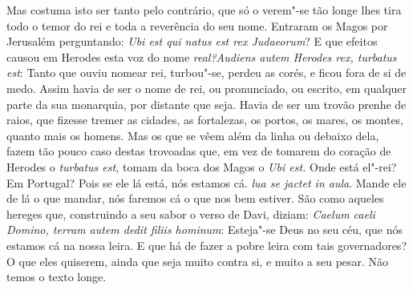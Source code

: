 Mas costuma isto ser tanto pelo contrário, que só o verem"-se tão longe
lhes tira todo o temor do rei e toda a reverência do seu nome. Entraram
os Magos por Jerusalém perguntando: \emph{Ubi est qui natus est rex
Judaeorum}? E que efeitos causou em Herodes esta voz do nome
\emph{real?Audiens autem Herodes rex, turbatus est}: Tanto que
ouviu nomear rei, turbou"-se, perdeu as corés, e ficou fora de si de
medo. Assim havia de ser o nome de rei, ou pronunciado, ou escrito,
em qualquer parte da sua monarquia, por distante que seja. Havia de ser
um trovão prenhe de raios, que fizesse tremer as cidades, as fortalezas,
os portos, os mares, os montes, quanto mais os homens. Mas os que se
vêem além da linha ou debaixo dela, fazem tão pouco caso destas
trovoadas que, em vez de tomarem do coração de Herodes o \emph{turbatus
est,} tomam da boca dos Magos o \emph{Ubi est.} Onde está el"-rei? Em
Portugal? Pois se ele lá está, nós estamos cá. \emph{lua se jactet in
aula}. Mande ele de lá o que mandar, nós faremos cá o que
nos bem estiver. São como aqueles hereges que, construindo a seu sabor o
verso de Davi, diziam: \emph{Caelum caeli Domino, terram autem dedit
filiis hominum}: Esteja"-se Deus no seu céu, que nós estamos
cá na nossa leira. E que há de fazer a pobre leira com tais
governadores? O que eles quiserem, ainda que seja muito contra si, e
muito a seu pesar. Não temos o texto longe.


